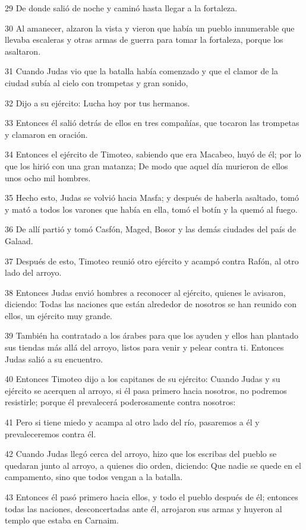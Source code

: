 \par 29 De donde salió de noche y caminó hasta llegar a la fortaleza.
\par 30 Al amanecer, alzaron la vista y vieron que había un pueblo innumerable que llevaba escaleras y otras armas de guerra para tomar la fortaleza, porque los asaltaron.
\par 31 Cuando Judas vio que la batalla había comenzado y que el clamor de la ciudad subía al cielo con trompetas y gran sonido,
\par 32 Dijo a su ejército: Lucha hoy por tus hermanos.
\par 33 Entonces él salió detrás de ellos en tres compañías, que tocaron las trompetas y clamaron en oración.
\par 34 Entonces el ejército de Timoteo, sabiendo que era Macabeo, huyó de él; por lo que los hirió con una gran matanza; De modo que aquel día murieron de ellos unos ocho mil hombres.
\par 35 Hecho esto, Judas se volvió hacia Masfa; y después de haberla asaltado, tomó y mató a todos los varones que había en ella, tomó el botín y la quemó al fuego.
\par 36 De allí partió y tomó Casfón, Maged, Bosor y las demás ciudades del país de Galaad.
\par 37 Después de esto, Timoteo reunió otro ejército y acampó contra Rafón, al otro lado del arroyo.
\par 38 Entonces Judas envió hombres a reconocer al ejército, quienes le avisaron, diciendo: Todas las naciones que están alrededor de nosotros se han reunido con ellos, un ejército muy grande.
\par 39 También ha contratado a los árabes para que los ayuden y ellos han plantado sus tiendas más allá del arroyo, listos para venir y pelear contra ti. Entonces Judas salió a su encuentro.
\par 40 Entonces Timoteo dijo a los capitanes de su ejército: Cuando Judas y su ejército se acerquen al arroyo, si él pasa primero hacia nosotros, no podremos resistirle; porque él prevalecerá poderosamente contra nosotros:
\par 41 Pero si tiene miedo y acampa al otro lado del río, pasaremos a él y prevaleceremos contra él.
\par 42 Cuando Judas llegó cerca del arroyo, hizo que los escribas del pueblo se quedaran junto al arroyo, a quienes dio orden, diciendo: Que nadie se quede en el campamento, sino que todos vengan a la batalla.
\par 43 Entonces él pasó primero hacia ellos, y todo el pueblo después de él; entonces todas las naciones, desconcertadas ante él, arrojaron sus armas y huyeron al templo que estaba en Carnaim.
